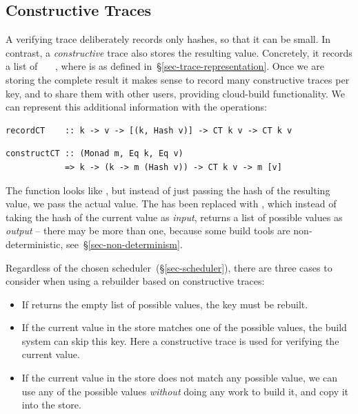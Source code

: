 \subsection{Constructive Traces}\label{sec-constructive-traces}

A verifying trace deliberately records only hashes, so that it can be small. In
contrast, a \emph{constructive} trace also stores the resulting value.
Concretely, it records a list of ~~~, where
 is as defined in~\S\ref{sec-trace-representation}. Once we are
storing the complete result it makes sense to record many constructive traces
per key, and to share them with other users, providing cloud-build
functionality. We can represent this additional information with the operations:

\vspace{1mm}
\begin{verbatim}
recordCT    :: k -> v -> [(k, Hash v)] -> CT k v -> CT k v
\end{verbatim}
\vspace{-2mm}
\begin{verbatim}
constructCT :: (Monad m, Eq k, Eq v)
            => k -> (k -> m (Hash v)) -> CT k v -> m [v]
\end{verbatim}
\vspace{1mm}

\noindent
The function  looks like , but instead of just passing
the hash of the resulting value, we pass the actual value. The 
has been replaced with , which instead of taking the hash of the
current value as \emph{input}, returns a list of possible values as
\emph{output} -- there may be more than one, because some build tools are
non-deterministic, see~\S\ref{sec-non-determinism}.

Regardless of the chosen scheduler~(\S\ref{sec-scheduler}), there are three
cases to consider when using a rebuilder based on constructive traces:

\begin{itemize}
  \item If  returns the empty list of possible values, the key
        must be rebuilt.
  \item If the current value in the store matches one of the possible values,
        the build system can skip this key. Here a constructive trace is used
        for verifying the current value.
  \item If the current value in the store does not match any possible value, we
        can use any of the possible values \emph{without} doing any work to
        build it, and copy it into the store.
\end{itemize}

